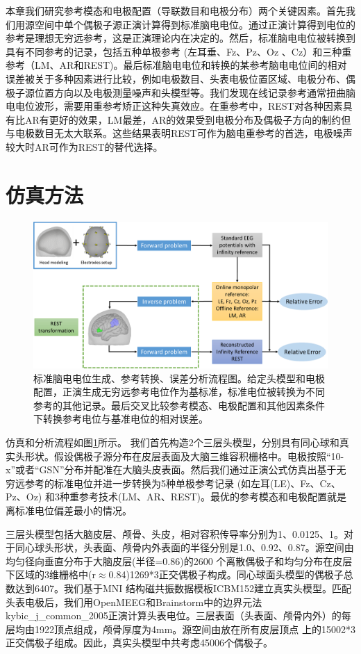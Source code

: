 本章我们研究参考模态和电极配置（导联数目和电极分布）两个关键因素。首先我们用源空间中单个偶极子源正演计算得到标准脑电电位。通过正演计算得到电位的参考是理想无穷远参考，这是正演理论内在决定的。然后，标准脑电电位被转换到具有不同参考的记录，包括五种单极参考 (左耳垂、Fz、Pz、Oz
、Cz）和三种重参考（LM、AR和REST)。最后标准脑电电位和转换的某参考脑电电位间的相对误差被关于多种因素进行比较，例如电极数目、头表电极位置区域、电极分布、偶极子源位置方向以及电极测量噪声和头模型等。我们发现在线记录参考通常扭曲脑电电位波形，需要用重参考矫正这种失真效应。在重参考中，REST对各种因素具有比AR有更好的效果，LM最差，AR的效果受到电极分布及偶极子方向的制约但与电极数目无太大联系。这些结果表明REST可作为脑电重参考的首选，电极噪声较大时AR可作为REST的替代选择。

\section{仿真方法}
\begin{figure}[!ht]
	\includegraphics[width=15cm]{pic/JNE/figure1.png}
	\caption{标准脑电电位生成、参考转换、误差分析流程图。给定头模型和电极配置，正演生成无穷远参考电位作为基标准，标准电位被转换为不同
	参考的其他记录。最后交叉比较参考模态、电极配置和其他因素条件下转换参考电位与基准电位的相对误差。}
	\label{2:pipe}
\end{figure}
仿真和分析流程如图\ref{2:pipe}所示。 我们首先构造2个三层头模型，分别具有同心球和真实头形状。假设偶极子源分布在皮层表面及大脑三维容积栅格中。电极按照“10-x”或者“GSN”分布并配准在大脑头皮表面。然后我们通过正演公式仿真出基于无穷远参考的标准电位并进一步转换为5种单极参考记录 (如左耳(LE)、Fz、Cz、Pz、Oz) 和3种重参考技术(LM、AR、REST)。最优的参考模态和电极配置就是离标准电位偏差最小的情况。

三层头模型包括大脑皮层、颅骨、头皮，相对容积传导率分别为1、0.0125、1。对于同心球头形状，头表面、颅骨内外表面的半径分别是1.0、0.92、0.87。源空间由均匀径向垂直分布于大脑皮层(半径=0.86)的2600
个离散偶极子和均匀分布在皮层下区域的3维栅格中(r$\approx$0.84)1269*3正交偶极子构成。同心球面头模型的偶极子总数达到6407。我们基于MNI
结构磁共振数据模板ICBM152建立真实头模型。匹配头表电极后，我们用OpenMEEG和Brainstorm中的边界元法\citing
{kybic_j_common_2005}正演计算头表电位。三层表面（头表面、颅骨内外）的每层均由1922顶点组成，颅骨厚度为4mm。源空间由放在所有皮层顶点
上的15002*3正交偶极子组成。因此，真实头模型中共考虑45006个偶极子。

